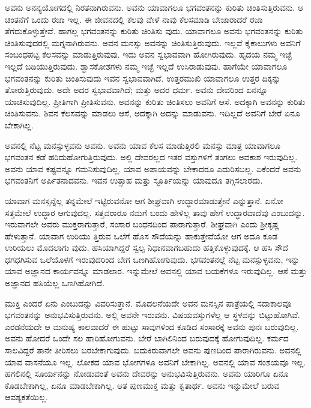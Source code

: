 ಅವನು ಅನನ್ಯಯೋಗದಲ್ಲಿ ನಿರತನಾಗಿರುವನು. ಅವನು ಯಾವಾಗಲೂ ಭಗವಂತನನ್ನು ಕುರಿತು ಚಿಂತಿಸುತ್ತಿರುವನು. ಆ ಚಿಂತನೆಗೆ ಒಂದು ರಜಾ ಇಲ್ಲ. ಈ ಜೀವನದಲ್ಲಿ ಕೆಲವು ವೇಳೆ ನಾವು ಕೆಲಸಮಾಡಿ ಬೇಜಾರಾದರೆ ರಜಾ ತೆಗೆದುಕೊಳ್ಳುತ್ತೇವೆ. ಹಾಗಲ್ಲ ಭಗವಂತನನ್ನು ಕುರಿತು ಚಿಂತಿಸು ವುದು. ಯಾವಾಗಲೂ ಅವನು ಭಗವಂತನನ್ನು ಕುರಿತು ಚಿಂತಿಸುವುದರಲ್ಲಿ ಮಗ್ನನಾಗಿರುವನು. ಅವನ ಮನಸ್ಸು ಅವನನ್ನು ಚಿಂತಿಸುತ್ತಿರುವುದು. ಇಲ್ಲವೆ ಕೈಕಾಲುಗಳು ಅವನಿಗೆ ಸಂಬಂಧಪಟ್ಟ ಕೆಲಸವನ್ನು ಮಾಡುತ್ತಿರುವುವು. ಇದು ಅವನ ಸ್ವಭಾವವಾಗಿ ಹೋಗಿರುವುದು. ಹೃದಯ ನಮ್ಮ ಇಚ್ಛೆ ಇಲ್ಲದೆ ಬಡಿಯುತ್ತಿರುವುದು. ಶ್ವಾಸಕೋಶಗಳು ನಮ್ಮ ಇಚ್ಛೆ ಇಲ್ಲದೆ ಉಸಿರಾಡುವುವು. ಹಾಗೆಯೇ ಯಾವಾಗಲೂ ಭಗವಂತನನ್ನು ಕುರಿತು ಚಿಂತಿಸುವುದು ಇವನ ಸ್ವಭಾವವಾಗಿದೆ. ಉತ್ತರಮುಖಿ ಯಾವಾಗಲೂ ಉತ್ತರ ದಿಕ್ಕನ್ನು ತೋರುತ್ತಿರುವುದು. ಅದೇ ಅದರ ಸ್ವಭಾವವಾಗಿದೆ; ಮತ್ತು ಅದರ ಧರ್ಮ. ಅವನು ದೇವರಿಂದ ಏನನ್ನೂ ಯಾಚಿಸುವುದಿಲ್ಲ. ಪ್ರೀತಿಗಾಗಿ ಪ್ರೀತಿಸುವನು. ಅವನನ್ನು ಕುರಿತು ಚಿಂತಿಸಲು ಅವನಿಗೆ ಆಸೆ. ಅದಕ್ಕಾಗಿ ಅವನನ್ನು ಕುರಿತು ಚಿಂತಿಸುವನು. ಶಿವನ ಕೆಲಸವನ್ನು ಮಾಡಲು ಆಸೆ, ಅದಕ್ಕಾಗಿ ಅದನ್ನು ಮಾಡುವನು. ಇದಿಲ್ಲದೆ ಅವನಿಗೆ ಬೇರೆ ಏನೂ ಬೇಕಾಗಿಲ್ಲ.

ಅವನಲ್ಲಿ ನೆಟ್ಟ ಮನಸ್ಸುಳ್ಳವನು ಅವನು. ಅವನು ಯಾವ ಕೆಲಸ ಮಾಡುತ್ತಿರಲಿ ಮನಸ್ಸು ಮಾತ್ರ ಯಾವಾಗಲೂ ಭಗವಂತನ ಕಡೆ ಹರಿದುಹೋಗುತ್ತಿರುವುದು. ಅಲ್ಲಿ ದೇವರಲ್ಲದ ಇತರ ವಸ್ತುಗಳಿಗೆ ತಂಗಲು ಅವಕಾಶ ಇರುವುದಿಲ್ಲ. ಅವನು ಯಾವ ಕಷ್ಟವನ್ನೂ ಗಮನಿಸುವುದಿಲ್ಲ. ಯಾವ ಅಪಾಯವನ್ನು ಬೇಕಾದರೂ ಎದುರಿಸಬಲ್ಲ. ಏಕೆಂದರೆ ಅವನು ಭಗವಂತನಿಗೆ ಅರ್ಪಿತನಾದವನು. ಇವನ ಉತ್ಸಾಹ ಮತ್ತು ಸ್ಫೂರ್ತಿಯನ್ನು ಯಾವುದೂ ತಗ್ಗಿಸಲಾರದು.

ಯಾವಾಗ ಮನಸ್ಸನ್ನೆಲ್ಲ ತನ್ನಮೇಲೆ ಇಟ್ಟಿರುವನೋ ಆಗ ಶೀಘ್ರವಾಗಿ ಉದ್ಧಾರಮಾಡುತ್ತೇನೆ ಎನ್ನುತ್ತಾನೆ. ಏನೋ ಸತ್ತಮೇಲೆ ಉದ್ಧಾರ ಆಗುವುದಲ್ಲ. ಸತ್ತವರಾರೂ ನಮಗೆ ಬಂದು ಹೇಳಿಲ್ಲ ತಾವು ಹೇಗೆ ಉದ್ಧಾರವಾದೆವು ಎಂಬುದನ್ನು. ಇರುವಾಗಲೇ ಅವರು ಮುಕ್ತರಾಗುತ್ತಾರೆ, ಸಂಸಾರ ಬಂಧನದಿಂದ ಪಾರಾಗುತ್ತಾರೆ. ಶೀಘ್ರವಾಗಿ ಎಂದು ಶ್ರೀಕೃಷ್ಣ ಹೇಳುತ್ತಾನೆ. ಯಾವಾಗ ಉರಿಯು ತ್ತಿರುವ ಒಲೆಗೆ ಹೊಸ ಸೌದೆಯನ್ನು ಹಾಕುತ್ತೇವೆಯೋ ಆಗ ಅದೂ ಕೂಡ ಉರಿಯಲು ಮೊದಲಾಗು ವುದು. ಹಸಿಯಾಗಿದ್ದರೆ ಸ್ವಲ್ಪ ನಿಧಾನವಾಗಬಹುದು ಹತ್ತಿಕೊಳ್ಳುವುದಕ್ಕೆ. ಆ ಹಸಿ ಸೌದೆ ಧಗಧಗಿಸುವ ಒಲೆಯೊಳಗೆ ಇರುವುದರಿಂದ ಬೇಗ ಒಣಗಿಹೋಗುವುದು. ಭಗವಂತನಲ್ಲೆ ನೆಟ್ಟ ಮನಸ್ಸುಳ್ಳವನು, ಇನ್ನು ಯಾವ ಅಜ್ಞಾನದ ಕಾರ್ಯವನ್ನೂ ಮಾಡಲಾರ. ಇನ್ನುಮೇಲೆ ಅವನಲ್ಲಿ ಯಾವ ಬಯಕೆಗಳೂ ಇರುವುದಿಲ್ಲ. ಆಸೆ ಮತ್ತು ಅಜ್ಞಾನದ ಹಸಿಯೆಲ್ಲ ಒಣಗಿಹೋಗಿದೆ.

ಮುಕ್ತಿ ಎಂದರೆ ಏನು ಎಂಬುದನ್ನು ವಿವರಿಸುತ್ತಾನೆ. ಮೊದಲನೆಯದೇ ಅವನ ಮನಸ್ಸಿನ ಪಾತ್ರೆಯಲ್ಲಿ ಸದಾಕಾಲವೂ ಭಗವಂತನನ್ನು ಅನುಭವಿಸುತ್ತಿರುವನು. ಅಲ್ಲಿ ಅವನೇ ಇರುವನು. ವಿಷಯವಸ್ತುಗಳೆಲ್ಲ ಆ ಸ್ಥಳವನ್ನು ಬಿಟ್ಟುಹೋಗಿವೆ. ಎರಡನೆಯದೇ ಆ ಮನುಷ್ಯ ಕಾಲವಾದರೆ ಈ ಹುಟ್ಟು ಸಾವುಗಳಿಂದ ಕೂಡಿದ ಸಂಸಾರಕ್ಕೆ ಅವನು ಪುನಃ ಬರುವುದಿಲ್ಲ. ಅವನು ಹೋದರೆ ಒಂದೇ ಸಲ ಹಾರಿಹೋಗುವನು. ಬೇರೆ ಬಾಗಿಲಿನಿಂದ ಬರುವುದಕ್ಕೆ ಹೋಗುವುದಿಲ್ಲ. ಕರ್ಮದ ಸಾಲವಿದ್ದರೆ ತಾನೇ ತೀರಿಸಲು ಬರಬೇಕಾಗುವುದು. ಬದುಕಿರುವಾಗಲೇ ಅವನು ಪುಣದಿಂದ ಪಾರಾಗಿರುವನು. ಅವನಲ್ಲಿ ಯಾವ ವಾಸನೆಯೂ ಇಲ್ಲ. ಲೋಕದ ಯಾವ ಭೋಗಗಳೂ ಅವನಿಗೆ ಬೇಕಾಗಿಲ್ಲ. ಅವನಲ್ಲಿ ಯಾವ ಸಂಶಯವೂ ಇಲ್ಲ. ಹಗಲಿನಲ್ಲಿ ಸೂರ್ಯನನ್ನು ನೋಡುವಂತೆ ಅವನು ದೇವರನ್ನು ಅನುಭವಿಸುತ್ತಿರುವನು. ಅವನು ಯಾರಿಗೂ ಏನೂ ಕೊಡಬೇಕಾಗಿಲ್ಲ, ಏನೂ ಮಾಡಬೇಕಾಗಿಲ್ಲ. ಆತ ಪುಣಮುಕ್ತ ಮತ್ತು ಕೃತಾರ್ಥ. ಅವನು ಇನ್ನುಮೇಲೆ ಬರುವ ಆವಶ್ಯಕತೆಯಿಲ್ಲ.

